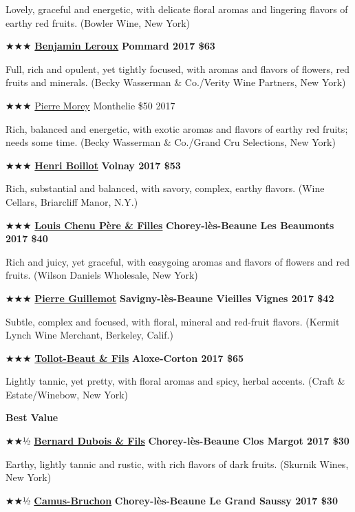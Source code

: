 Lovely, graceful and energetic, with delicate floral aromas and
lingering flavors of earthy red fruits. (Bowler Wine, New York)

★★★
\href{https://www.beckywasserman.com/domaines/benjamin-leroux/\#.Xtv-s55KiMI}{\textbf{Benjamin
Leroux}} \textbf{Pommard 2017 \$63}

Full, rich and opulent, yet tightly focused, with aromas and flavors of
flowers, red fruits and minerals. (Becky Wasserman \& Co./Verity Wine
Partners, New York)

★★★ \href{http://www.morey-meursault.fr/en/}{Pierre Morey} Monthelie
\$50 2017

Rich, balanced and energetic, with exotic aromas and flavors of earthy
red fruits; needs some time. (Becky Wasserman \& Co./Grand Cru
Selections, New York)

★★★ \href{http://www.henri-boillot.com/\#!en/}{\textbf{Henri Boillot}}
\textbf{Volnay 2017 \$53}

Rich, substantial and balanced, with savory, complex, earthy flavors.
(Wine Cellars, Briarcliff Manor, N.Y.)

★★★ \href{http://www.louischenu.com/indexuk.php}{\textbf{Louis Chenu
Père \& Filles}} \textbf{Chorey-lès-Beaune Les Beaumonts 2017 \$40}

Rich and juicy, yet graceful, with easygoing aromas and flavors of
flowers and red fruits. (Wilson Daniels Wholesale, New York)

★★★
\href{https://www.kermitlynch.com/our-wines/domaine-pierre-guillemot/}{\textbf{Pierre
Guillemot}} \textbf{Savigny-lès-Beaune Vieilles Vignes 2017 \$42}

Subtle, complex and focused, with floral, mineral and red-fruit flavors.
(Kermit Lynch Wine Merchant, Berkeley, Calif.)

★★★
\href{https://www.winebow.com/our-brands/domaine-tollot-beaut}{\textbf{Tollot-Beaut
\& Fils}} \textbf{Aloxe-Corton 2017 \$65}

Lightly tannic, yet pretty, with floral aromas and spicy, herbal
accents. (Craft \& Estate/Winebow, New York)

\textbf{Best Value}

★★½
\href{https://www.skurnik.com/producer/domaine-dubois-bernard-et-fils/}{\textbf{Bernard
Dubois \& Fils}} \textbf{Chorey-lès-Beaune Clos Margot 2017 \$30}

Earthy, lightly tannic and rustic, with rich flavors of dark fruits.
(Skurnik Wines, New York)

★★½
\href{https://polanerselections.com/producer/camus-bruchon}{\textbf{Camus-Bruchon}}
\textbf{Chorey-lès-Beaune Le Grand Saussy 2017 \$30}

